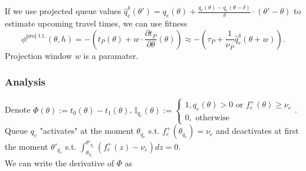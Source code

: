 \documentclass[12pt]{article}
\begin{document}
If we use projected queue values $\hat{q}^{\delta}_e(\theta') = q_e(\theta) + \frac{q_e(\theta) - q_e(\theta - \delta)}{\delta} \cdot (\theta' - \theta)$ to estimate upcoming travel times, we can use fitness $$ \phi^{\text{proj t.t.}}(\theta, h) = -(t_P(\theta) + w \cdot \frac{\partial t_P}{\partial \theta}(\theta)) \approx - ( \tau_P + \frac{1}{\nu_P} \hat{q}^{\delta}_e(\theta + w) ). $$  Projection window $w$ is a paramater. 

\subsubsection*{Analysis}
Denote  $\Phi(\theta) := t_0(\theta) - t_1(\theta)$,  $\mathbb{I}_{q_e}(\theta) := \begin{cases} 1, q_e(\theta) > 0 \text{ or } f_e^+(\theta) \geq \nu_e \\ 0, \text{ otherwise}\end{cases}$.
\\
Queue $q_e$ "activates" at the moment $ \theta_{q_e} $ s.t. $f_e^+( \theta_{q_e}) = \nu_e $ and deactivates at first the moment $\theta'_{q_e}$ s.t. $\int_{\theta_{q_e}}^{ \theta'_{q_e}} (f_e^+(z) - \nu_e)  dz  = 0$.
\\
We can write the derivative of $\Phi$ as
\end{document}
